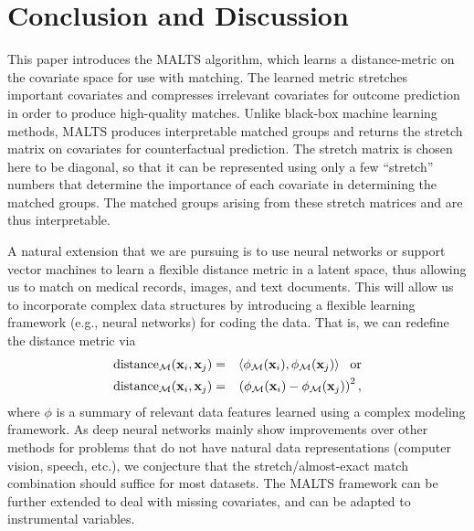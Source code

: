 \section{Conclusion and Discussion}\label{sec:Conclusion}
This paper introduces the MALTS algorithm, which learns a distance-metric on the covariate space for use with matching. The learned metric stretches important covariates and compresses irrelevant covariates for outcome prediction in order to produce high-quality matches. 
Unlike black-box machine learning methods, MALTS produces interpretable matched groups and returns the stretch matrix on covariates for counterfactual prediction. The stretch matrix is chosen here to be diagonal, so that it can be represented using only a few ``stretch'' numbers that determine the importance of each covariate in determining the matched groups. The matched groups arising from these stretch matrices and are thus interpretable.

A natural extension that we are pursuing is to use neural networks or support vector machines to learn a flexible distance metric in a latent space, thus allowing us to match on medical records, images, and text documents.  This will allow us to incorporate complex data structures by introducing a flexible learning framework (e.g., neural networks) for coding the data. That is, we can redefine the distance metric via
\begin{eqnarray*}\nonumber
\textrm{distance}_{\mathcal{M}} (\mathbf{x}_i,\mathbf{x}_j) &=& \langle\phi_{\mathcal{M}}(\mathbf{x}_i),\phi_{\mathcal{M}}(\mathbf{x}_j) \rangle \;\;\;\textrm{or}\\\nonumber
\textrm{distance}_{\mathcal{M}} (\mathbf{x}_i,\mathbf{x}_j) &=& \left(\phi_{\mathcal{M}}(\mathbf{x}_i)-\phi_{\mathcal{M}}(\mathbf{x}_j)\right)^2,
\end{eqnarray*}
where $\phi$ is a summary of relevant data features learned using a complex modeling framework. As deep neural networks mainly show improvements over other methods for problems that do not have natural data representations (computer vision, speech, etc.), we conjecture that the stretch/almost-exact match combination should suffice for most datasets. The MALTS framework can be further extended to deal with missing covariates, and can be adapted to instrumental variables. 
